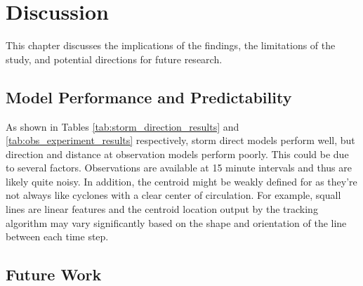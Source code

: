 \chapter{Discussion}
\label{ch:discuss}

This chapter discusses the implications of the findings, the limitations of the study, and potential directions for future research.

\section{Model Performance and Predictability}

As shown in Tables \ref{tab:storm_direction_results} and \ref{tab:obs_experiment_results} respectively, storm direct models perform well, but direction and distance at observation models perform poorly.
This could be due to several factors. Observations are available at 15 minute intervals and thus are likely quite noisy. In addition, the centroid might be weakly defined for  as they're not always like cyclones with a clear center of circulation. For example, squall lines are linear features and the centroid location output by the tracking algorithm may vary significantly based on the shape and orientation of the line between each time step.

\section{Future Work}

